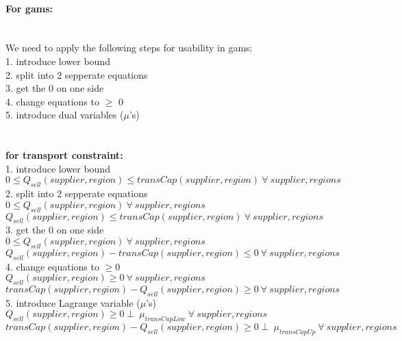 \documentclass{article}
\begin{document}
\paragraph*{For gams:}
\hfill\\
We need to apply the following steps for usability in gams:\\
1. introduce lower bound\\
2. split into 2 sepperate equations\\
3. get the 0 on one side\\
4. change equations to $\geq$ 0\\
5. introduce dual variables ($\mu$'s)\\
\hfil\\
\hfill\\
\textbf{for	transport constraint: }\\
1. introduce lower bound\\
\quad$0 \leq Q_{sell}(supplier, region) \leq transCap(supplier, region)\: \forall \: supplier,regions$\\
2. split into 2 sepperate equations\\
\quad$0 \leq Q_{sell}(supplier, region)\: \forall \: supplier,regions$\\
\quad$Q_{sell}(supplier, region) \leq transCap(supplier, region)\: \forall \: supplier,regions$\\
3. get the 0 on one side\\
\quad$0 \leq Q_{sell}(supplier, region)\: \forall \: supplier,regions$\\
\quad$Q_{sell}(supplier, region) - transCap(supplier, region) \leq 0\: \forall \: supplier,regions$\\
4. change equations to $\geq 0$\\
\quad$ Q_{sell}(supplier, region) \geq 0 \: \forall \: supplier,regions$\\
\quad$transCap(supplier, region) - Q_{sell}(supplier, region) \geq 0 \: \forall \: supplier,regions$\\
5. introduce Lagrange variable ($\mu$'s)\\
\quad$Q_{sell}(supplier, region) \geq 0  \perp\: \mu_{transCapLow} \: \forall \: supplier,regions$\\
\quad$transCap(supplier, region) - Q_{sell}(supplier, region) \geq 0  \perp\: \mu_{transCapUp} \: \forall \: supplier,regions$\\
\end{document}
